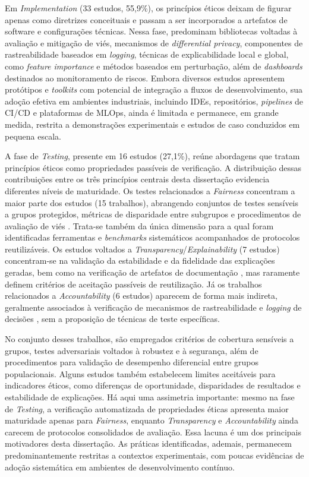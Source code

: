 Em \textit{Implementation} (33 estudos, 55,9\%), os princípios éticos deixam de figurar apenas como diretrizes conceituais e passam a ser incorporados a artefatos de software e configurações técnicas. Nessa fase, predominam bibliotecas voltadas à avaliação e mitigação de viés, mecanismos de \textit{differential privacy}, componentes de rastreabilidade baseados em \textit{logging}, técnicas de explicabilidade local e global, como \textit{feature importance} e métodos baseados em perturbação, além de \textit{dashboards} destinados ao monitoramento de riscos. Embora diversos estudos apresentem protótipos e \textit{toolkits} com potencial de integração a fluxos de desenvolvimento, sua adoção efetiva em ambientes industriais, incluindo IDEs, repositórios, \textit{pipelines} de CI/CD e plataformas de MLOps, ainda é limitada e permanece, em grande medida, restrita a demonstrações experimentais e estudos de caso conduzidos em pequena escala.

A fase de \textit{Testing}, presente em 16 estudos (27,1\%), reúne abordagens que tratam princípios éticos como propriedades passíveis de verificação. A distribuição dessas contribuições entre os três princípios centrais desta dissertação evidencia diferentes níveis de maturidade. Os testes relacionados a \textit{Fairness} concentram a maior parte dos estudos (15 trabalhos), abrangendo conjuntos de testes sensíveis a grupos protegidos, métricas de disparidade entre subgrupos e procedimentos de avaliação de viés \cite{S022, S045, S004, S010, S036}. Trata-se também da única dimensão para a qual foram identificadas ferramentas e \textit{benchmarks} sistemáticos acompanhados de protocolos reutilizáveis. Os estudos voltados a \textit{Transparency}/\textit{Explainability} (7 estudos) concentram-se na validação da estabilidade e da fidelidade das explicações geradas, bem como na verificação de artefatos de documentação \cite{S014, S021, S053}, mas raramente definem critérios de aceitação passíveis de reutilização. Já os trabalhos relacionados a \textit{Accountability} (6 estudos) aparecem de forma mais indireta, geralmente associados à verificação de mecanismos de rastreabilidade e \textit{logging} de decisões \cite{S013, S014, S039}, sem a proposição de técnicas de teste específicas.

No conjunto desses trabalhos, são empregados critérios de cobertura sensíveis a grupos, testes adversariais voltados à robustez e à segurança, além de procedimentos para validação de desempenho diferencial entre grupos populacionais. Alguns estudos também estabelecem limites aceitáveis para indicadores éticos, como diferenças de oportunidade, disparidades de resultados e estabilidade de explicações. Há aqui uma assimetria importante: mesmo na fase de \textit{Testing}, a verificação automatizada de propriedades éticas apresenta maior maturidade apenas para \textit{Fairness}, enquanto \textit{Transparency} e \textit{Accountability} ainda carecem de protocolos consolidados de avaliação. Essa lacuna é um dos principais motivadores desta dissertação. As práticas identificadas, ademais, permanecem predominantemente restritas a contextos experimentais, com poucas evidências de adoção sistemática em ambientes de desenvolvimento contínuo.

